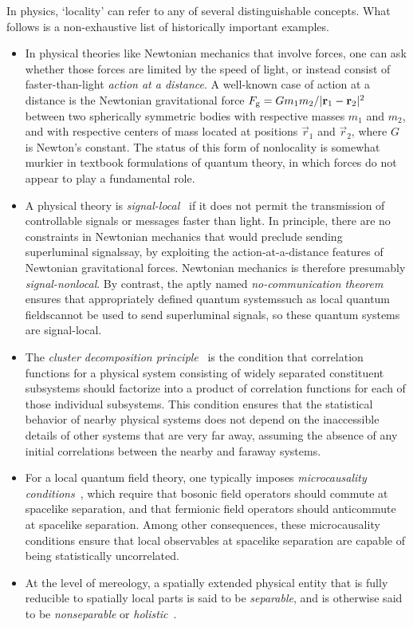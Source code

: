 \documentclass[12pt,english,prl,superscriptaddress,nobibnotes,nofootinbib]{revtex4-2}
\begin{document}
In physics, \textquoteleft locality\textquoteright{} can refer to
any of several distinguishable concepts. What follows is a non-exhaustive
list of historically important examples.
\begin{itemize}
\item In physical theories like Newtonian mechanics that involve forces,
one can ask whether those forces are limited by the speed of light,
or instead consist of faster-than-light \emph{action at a distance}.
A well-known case of action at a distance is the Newtonian gravitational
force $F_{\textrm{g}}=Gm_{1}m_{2}/\vert\mathbf{r}_{1}-\mathbf{r}_{2}\vert^{2}$
between two spherically symmetric bodies with respective masses $m_{1}$
and $m_{2}$, and with respective centers of mass located at positions
$\vec r_{1}$ and $\vec r_{2}$, where $G$ is Newton's constant.
The status of this form of nonlocality is somewhat murkier in textbook
formulations of quantum theory, in which forces do not appear to play
a fundamental role.
\item A physical theory is \emph{signal-local}~\citep{Skyrms:1982cdalc,Skyrms:1984elfm}
if it does not permit the transmission of controllable signals or
messages faster than light. In principle, there are no constraints
in Newtonian mechanics that would preclude sending superluminal signals\textemdash say,
by exploiting the action-at-a-distance features of Newtonian gravitational
forces. Newtonian mechanics is therefore presumably \emph{signal-nonlocal}.
By contrast, the aptly named \emph{no-communication theorem}~\citep{GhirardiRiminiWeber:1980agaastttqmmp,Jordan:1983qcdnts}
ensures that appropriately defined quantum systems\textemdash such
as local quantum fields\textemdash cannot be used to send superluminal
signals, so these quantum systems are signal-local.
\item The \emph{cluster decomposition principle}~\citep{WichmannCrichton:1963cdpotsm,Weinberg:1996tqtfi}
is the condition that correlation functions for a physical system
consisting of widely separated constituent subsystems should factorize
into a product of correlation functions for each of those individual
subsystems. This condition ensures that the statistical behavior of
nearby physical systems does not depend on the inaccessible details
of other systems that are very far away, assuming the absence of any
initial correlations between the nearby and faraway systems.
\item For a local quantum field theory, one typically imposes \emph{microcausality conditions}~\citep{Weinberg:1996tqtfi},
which require that bosonic field operators should commute at spacelike
separation, and that fermionic field operators should anticommute
at spacelike separation. Among other consequences, these microcausality
conditions ensure that local observables at spacelike separation are
capable of being statistically uncorrelated.
\item At the level of mereology, a spatially extended physical entity that
is fully reducible to spatially local parts is said to be \emph{separable},
and is otherwise said to be \emph{nonseparable} or \emph{holistic}~\citep{Howard:1985eolas,Howard:1989hsatmiotbe}.
\end{itemize}
\end{document}
